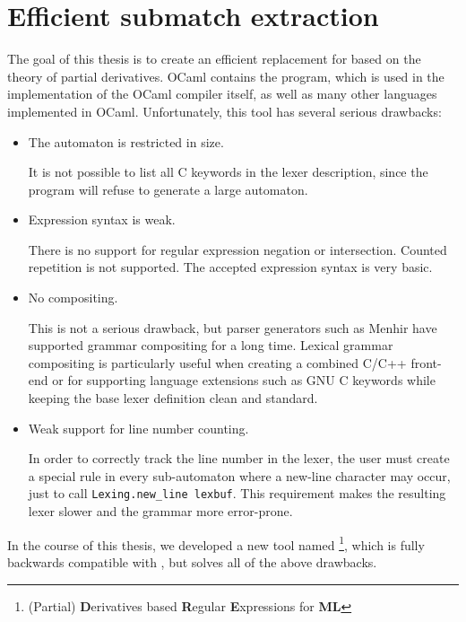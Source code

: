 \section{Efficient submatch extraction}

The goal of this thesis is to create an efficient replacement for \ocamllex{}
based on the theory of partial derivatives. OCaml contains the \ocamllex{}
program, which is used in the implementation of the OCaml compiler itself, as
well as many other languages implemented in OCaml.  Unfortunately, this tool has
several serious drawbacks:

\begin{itemize}

   \item The automaton is restricted in size.

      It is not possible to list all C keywords in the lexer description, since
      the program will refuse to generate a large automaton.

   \item Expression syntax is weak.

      There is no support for regular expression negation or intersection.
      Counted repetition is not supported. The accepted expression syntax is
      very basic.

   \item No compositing.

      This is not a serious drawback, but parser generators such as Menhir have
      supported grammar compositing for a long time. Lexical grammar compositing
      is particularly useful when creating a combined C/C++ front-end or for
      supporting language extensions such as GNU C keywords while keeping the
      base lexer definition clean and standard.

   \item Weak support for line number counting.

      In order to correctly track the line number in the lexer, the user must
      create a special rule in every sub-automaton where a new-line character
      may occur, just to call \texttt{Lexing.new\_line lexbuf}. This requirement
      makes the resulting lexer slower and the grammar more error-prone.

\end{itemize}

In the course of this thesis, we developed a new tool named
\dreml\footnote{(Partial) \textbf{D}erivatives based \textbf{R}egular
\textbf{E}xpressions for \textbf{ML}}, which is fully backwards compatible with
\ocamllex, but solves all of the above drawbacks.

